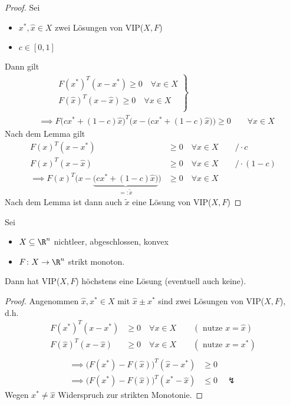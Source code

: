 \begin{proof}
	Sei
	\begin{itemize}
		\item ${x}^{*}, \hat{x} \in X$ zwei Lösungen von VIP($X,F$)
		\item $c \in [0,1]$
	\end{itemize}
	Dann gilt
	\begin{align*}
		&\qquad\left.
		\begin{array}{r}
		F({x}^{*})^{T}(x-{x}^{*}) \geq  0 \quad \forall x \in X \\
		F(\hat{x})^{T}(x-\hat{x}) \geq  0 \quad \forall x \in X \\
		\end{array}
	\right\}\\
	&\implies
	F\Big(c{x}^{*}+(1-c)\hat{x}\Big)^{T}\bigg(x-\Big(c{x}^{*}+(1-c)\hat{x}\Big)\bigg) \geq  0 
		\qquad\forall x \in X
	\end{align*}
	Nach dem Lemma gilt
	\begin{align*}
		F(x)^{T}(x-{x}^{*}) &\geq 0 \quad \forall x \in X \qquad/\cdot c \\
		F(x)^{T}(x-\hat{x}) &\geq 0 \quad \forall x \in X \qquad/\cdot (1-c) \\
		\implies F(x)^{T}\bigg(x-\underbrace{\Big(c{x}^{*}+(1-c)\hat{x}\Big)}_{=:\tilde{x}} \bigg) &\geq 0 \quad \forall x \in X
	\end{align*}
	Nach dem Lemma ist dann auch $\tilde{x}$ eine Lösung von VIP($X,F$)
\end{proof}

\begin{satz}
	Sei
	\begin{itemize}
		\item $X \subseteq \R^{n}$ nichtleer, abgeschlossen, konvex
		\item $F \colon X \rightarrow \R^{n} $ strikt monoton.
	\end{itemize}
	Dann hat VIP($X,F$) höchstens eine Lösung (eventuell auch keine).
\end{satz}

\begin{proof}
	Angenommen $\hat{x}, {x}^{*} \in X$ mit $\hat{x} \pm {x}^{*}$ sind zwei Lösungen von VIP($X,F$), d.h.
	\begin{align*}
		F({x}^{*})^{T}(x-{x}^{*}) &\geq 0 \quad \forall x \in X \qquad (\text{ nutze }x=\hat{x}) \\
		F(\hat{x})^{T}(x-\hat{x}) &\geq 0 \quad \forall x \in X \qquad (\text{ nutze }x={x}^{*}) \\
	\end{align*}
	\begin{align*}
		\implies \Big( F({x}^{*}) - F(\hat{x}) \Big) ^{T} (\hat{x} - {x}^{*}) &\geq  0 \\
		\implies \Big( F({x}^{*}) - F(\hat{x}) \Big) ^{T} ({x}^{*} -\hat{x} ) &\leq  0 \quad\lightning
	\end{align*}
	Wegen ${x}^{*} \neq \hat{x}$ Widerspruch zur strikten Monotonie.
\end{proof}

